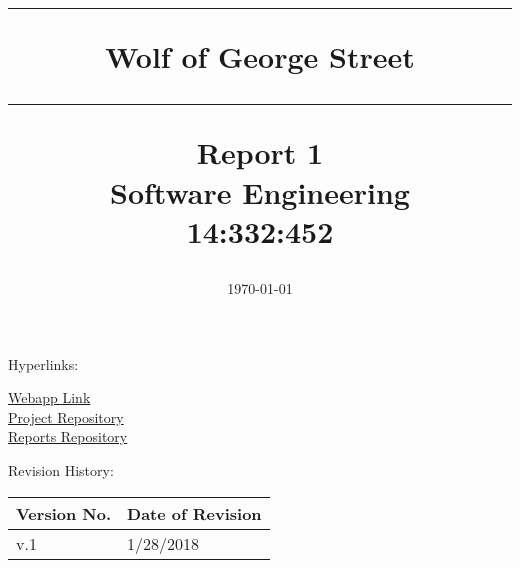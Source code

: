 \documentclass[11pt,letterpaper,oneside]{memoir}
\title{%
{\color{color2} \hrule}\vspace{1cm}
\Huge{\color{red} Wolf of George Street
\vspace{1cm}
{\color{color2} \hrule}\vspace{1cm}}
\Large{ \color{color2} Report 1\\Software Engineering\\
14:332:452}
}
\author{\huge{\color{red}Team 9:\\}\vskip.1in
\Large{\href{mailto:klt117@scarletmail.rutgers.edu}{\color{red}Kyle Thakker}\\
\href{mailto:minjun2282@gmail.com}{\color{red}Min Jun Kim}\\
\href{mailto:andy.i.val@rutgers.edu}{\color{red}Andy Val}\\
\href{mailto:xodnjs55@gmail.com}{\color{red}Taewon Kim}\\
\href{mailto:dly24@scarletmail.rutgers.edu}{\color{red}Dan Yates}\\
\href{mailto:cjm351@scarletmail.rutgers.edu}{\color{red}Colter Mooney}\\
\href{mailto:anb130@scarletmail.rutgers.edu}{\color{red}Amina Bright}\\
\href{mailto:kishanpatel0897@gmail.com}{\color{red}Kishan Patel}\\
\href{mailto:quentin1120@live.com}{\color{red}Quentin Lester}}}
\date{\today}
\begin{document}
\titleGM    %

Hyperlinks:\\
\begin{center}
\href{https://sites.google.com/scarletmail.rutgers.edu/wolf-of-george-street/home}{\color{red}Webapp Link}\\
\href{https://github.com/amina-bright/Wolf-of-George-Street-}{\color{red}Project Repository}\\
\href{https://github.com/amina-bright/Wolf-of-George-Street-}{\color{red}Reports Repository}\\
\end{center}

Revision History:
\begin{longtable}{|p{1.6in}|p{2.6in}|}
\hline
{\large\color{red}Version No.}&{\large\color{red}Date of Revision}\\
    \hline
v.1&1/28/2018  \\ \hline
\end{longtable}

\pagebreak  %
\tableofcontents %
\setlength\parindent{0pt}
\end{document}
